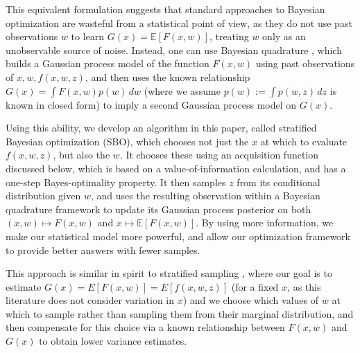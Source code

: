 \documentclass{article} %
\newcommand{\w}{w}
\newcommand{\z}{z}
\newcommand{\pfcomment}[1]{{\color{red} PF: #1}}
\begin{document}
This equivalent formulation suggests that standard approaches to Bayesian optimization are wasteful from a statistical point of view, as they do not use past observations $\w$ to learn $G(x) = \mathbb{E}[F(x,\w)]$, treating $\w$ only as an unobservable source of noise.  Instead, one can use Bayesian quadrature \cite{o1991bayes}, which builds a Gaussian process model of the function $F(x,\w)$ using past observations of $x,\w,f(x,\w,\z)$, and then uses the known relationship $G(x) = \int F(x,w) p(w)\,dw$ (where we assume $p(w):=\int p(\w,\z)\,d\z$ is known in closed form) to imply a second Gaussian process model on $G(x)$.

Using this ability, we develop an algorithm in this paper, called stratified Bayesian optimization (SBO), which chooses not just the $x$ at which to evaluate $f(x,\w,\z)$, but also the $\w$.  It chooses these using an acquisition function discussed below, which is based on a value-of-information \cite{Ho66} calculation, and has a one-step Bayes-optimality property.  It then samples $\z$ from its conditional distribution given $\w$, and uses the resulting observation within a Bayesian quadrature framework to update its Gaussian process posterior on both $(x,\w)\mapsto F(x,\w)$ and $x\mapsto \mathbb{E}[F(x,\w)]$.  By using more information, we make our statistical model more powerful, and allow our optimization framework to provide better answers with fewer samples.

This approach is similar in spirit to stratified sampling \cite{glasserman2003monte}, where our goal is to estimate $G(x) = E[F(x,\w)]=E[f(x,\w,\z)]$ (for a fixed $x$, as this literature does not consider variation in $x$) and we choose which values of $\w$ at which to sample rather than sampling them from their marginal distribution, and then compensate for this choice via a known relationship between $F(x,\w)$ and $G(x)$ to obtain lower variance estimates.


\end{document}
